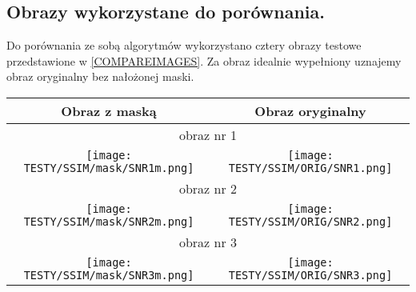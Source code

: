 \documentclass[a4paper,12pt,twoside,openany]{report}
\def \SNRI{obraz nr 1}
\def \SNRII{obraz nr 2}
\def \SNRIII{obraz nr 3}
\begin{document}
\subsection{Obrazy wykorzystane do porównania.}
Do porównania ze sobą algorytmów wykorzystano cztery obrazy testowe przedstawione w \autoref{COMPAREIMAGES}. Za obraz idealnie wypełniony uznajemy obraz oryginalny bez nałożonej maski.
\begin{longtable}[h!]{|c|c|}
    \hline
    Obraz z maską & Obraz oryginalny \\ \hline

    \multicolumn{2}{|c|}{
		\SNRI
    } \\ \hline 
    \begin{minipage}{0.5\textwidth}
    \vspace{0.2cm}
    \centering
    \texttt{[image: TESTY/SSIM/mask/SNR1m.png]}
    \vspace{0.2cm}
    \end{minipage}
	&
    \begin{minipage}{0.5\textwidth}
    \vspace{0.2cm}
    \centering
    \texttt{[image: TESTY/SSIM/ORIG/SNR1.png]}
    \vspace{0.2cm}
    \end{minipage}\\ \hline

    \multicolumn{2}{|c|}{
		\SNRII
    } \\ \hline 
    \begin{minipage}{0.5\textwidth}
    \vspace{0.2cm}
    \centering
    \texttt{[image: TESTY/SSIM/mask/SNR2m.png]}
    \vspace{0.2cm}
    \end{minipage}
	&
    \begin{minipage}{0.5\textwidth}
    \vspace{0.2cm}
    \centering
    \texttt{[image: TESTY/SSIM/ORIG/SNR2.png]}
    \vspace{0.2cm}
    \end{minipage}\\ \hline

    \multicolumn{2}{|c|}{
		\SNRIII
    } \\ \hline 
    \begin{minipage}{0.5\textwidth}
    \vspace{0.2cm}
    \centering
    \texttt{[image: TESTY/SSIM/mask/SNR3m.png]}
    \vspace{0.2cm}
    \end{minipage}
	&
    \begin{minipage}{0.5\textwidth}
    \vspace{0.2cm}
    \centering
    \texttt{[image: TESTY/SSIM/ORIG/SNR3.png]}
    \vspace{0.2cm}
    \end{minipage}\\ \hline


\end{longtable}
\end{document}
